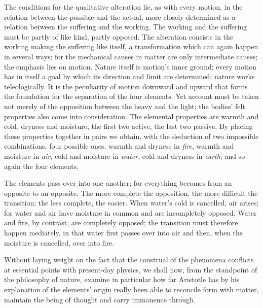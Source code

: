 \documentclass[12pt,a4paper]{book}
\begin{document}
The conditions for the qualitative alteration lie, as with every motion, in the relation between the possible
and the actual, more closely determined as a relation between the suffering and the working. The working and
the suffering must be partly of like kind, partly opposed. The alteration consists in the working making the
suffering like itself, a transformation which can again happen in several ways; for the mechanical causes in
matter are only intermediate causes; the emphasis lies on motion. Nature itself is motion's inner ground;
every motion has in itself a goal by which its direction and limit are determined: nature works teleologically.
It is the peculiarity of motion downward and upward that forms the foundation for the separation of the four
elements. Yet account must be taken not merely of the opposition between the heavy and the light; the bodies'
felt properties also come into consideration. The elemental properties are warmth and cold, dryness and
moisture, the first two
active, the last two passive. By placing these properties together in pairs we obtain, with the deduction of
two impossible combinations, four possible ones: warmth and dryness in \emph{fire}, warmth and moisture in
\emph{air}, cold and moisture in \emph{water}, cold and dryness in \emph{earth}; and so again the four elements.

The elements pass over into one another; for everything becomes from an opposite to an opposite. The more
complete the opposition, the more difficult the transition; the less complete, the easier. When water's cold is
cancelled, air arises; for water and air have moisture in common and are incompletely opposed. Water and fire,
by contrast, are completely opposed; the transition must therefore happen mediately, in that water first passes
over into air and then, when the moisture is cancelled, over into fire.

Without laying weight on the fact that the construal of the phenomena conflicts at essential points with
present-day physics, we shall now, from the standpoint of the philosophy of nature, examine in particular how
far Aristotle has by his explanation of the elements' origin really been able to reconcile form with matter,
maintain the being of thought and carry immanence through.
\end{document}
